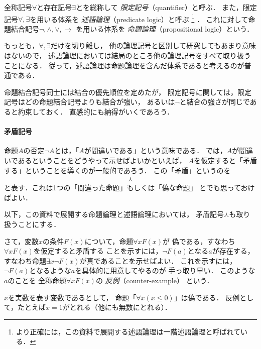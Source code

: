   全称記号$\forall$と存在記号$\exists$とを総称して
  \emph{限定記号}（quantifier）と呼ぶ．
  また，限定記号$\forall,  \exists$を用いる体系を
  \emph{述語論理}（predicate logic）と呼ぶ
  \footnote{より正確には，この資料で展開する述語論理は一階述語論理と呼ばれている．}
  ．
  これに対して命題結合記号$\lnot ,  \land ,  \lor ,  \to$
  を用いる体系を
  \emph{命題論理}（propositional logic）という．

  もっとも，$\forall ,  \exists$だけを切り離し，
  他の論理記号と区別して研究してもあまり意味はないので，
  述語論理においては結局のところ他の論理記号をすべて取り扱うことになる．
  従って，述語論理は命題論理を含んだ体系であると考えるのが普通である．

  命題結合記号同士には結合の優先順位を定めたが，
  限定記号に関しては，限定記号はどの命題結合記号よりも結合が強い，
  あるいは$\lnot$と結合の強さが同じであると約束しておく．
  直感的にも納得がいくであろう．

  
 \paragraph{矛盾記号}
  命題$A$の否定$\lnot A$とは，「$A$が間違いである」という意味である．
  では，$A$が間違いであるということをどうやって示せばよいかといえば，
  $A$を仮定すると「矛盾する」ということを導くのが一般的であろう．
  この「矛盾」というのを
  \begin{align}
    \curlywedge
    \label{eq:mujun}
  \end{align}
  と表す．これは1つの「間違った命題」もしくは「偽な命題」
  とでも思っておけばよい．

  以下，この資料で展開する命題論理と述語論理においては，
  矛盾記号$\curlywedge$も取り扱うことにする．

  さて，変数$x$の条件$F(x)$について，命題$\forall x F(x)$が
  偽である，すなわち$\forall x F(x)$を仮定すると矛盾する
  ことを示すには，$\lnot F(a)$となる$a$が存在する，
  すなわち命題$\exists x \lnot F(x)$が真であることを示せばよい．
  これを示すには，$\lnot F (a)$となるような$a$を具体的に用意してやるのが
  手っ取り早い．
  このような$a$のことを
  全称命題$\forall x F(x)$の
  \emph{反例}（counter-example）
  という．

  \begin{ex}
    $x$を実数を表す変数であるとして，
    命題「$\forall x ( x \leq 0)$」は偽である．
    反例として，たとえば$x=1$がとれる（他にも無数にとれる）．
  \end{ex}

